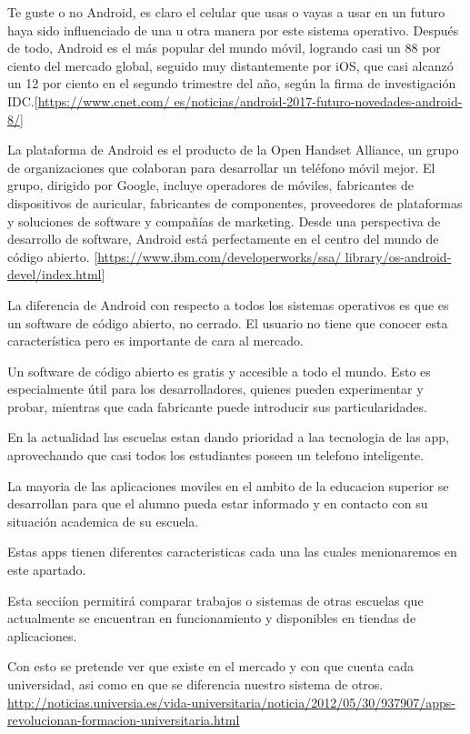 Te guste o no Android, es claro el celular que usas o vayas a usar en un futuro haya sido influenciado de 
una u otra manera por este sistema operativo. Después de todo, Android es el más popular del mundo móvil, 
logrando casi un 88 por ciento del mercado global, seguido muy distantemente por iOS, que casi alcanzó un 
12 por ciento en el segundo trimestre del año, según la firma de investigación IDC.[\url{https://www.cnet.com/
es/noticias/android-2017-futuro-novedades-android-8/}]

La plataforma de Android es el producto de la Open Handset Alliance, un grupo de organizaciones que 
colaboran para desarrollar un teléfono móvil mejor. El grupo, dirigido por Google, incluye operadores de 
móviles, fabricantes de dispositivos de auricular, fabricantes de componentes, proveedores de plataformas y 
soluciones de software y compañías de marketing. Desde una perspectiva de desarrollo de software, Android 
está perfectamente en el centro del mundo de código abierto. [\url{https://www.ibm.com/developerworks/ssa/
library/os-android-devel/index.html}]

La diferencia de Android con respecto a todos los sistemas operativos  es que es un software de código 
abierto, no cerrado. El usuario no tiene que conocer esta característica pero es importante de cara al 
mercado.


Un software de código abierto es gratis y accesible a todo el mundo. Esto es especialmente útil para los 
desarrolladores, quienes pueden experimentar y probar, mientras que cada fabricante puede introducir sus 
particularidades. 


En la actualidad las escuelas estan dando prioridad a laa tecnologia de las app, aprovechando que casi 
todos los estudiantes poseen un telefono inteligente.


La mayoria de las aplicaciones moviles en el ambito de la educacion superior se desarrollan para que el 
alumno pueda estar informado y en contacto con su situación academica de su escuela.

Estas apps tienen diferentes caracteristicas cada una las cuales menionaremos en este apartado.

Esta secciíon permitirá comparar trabajos o sistemas de otras escuelas que actualmente se encuentran en 
funcionamiento y disponibles en tiendas de aplicaciones.

Con esto se pretende ver que existe en el mercado y con que cuenta cada universidad, asi como en que se 
diferencia nuestro sistema de otros.
\url{http://noticias.universia.es/vida-universitaria/noticia/2012/05/30/937907/apps-revolucionan-formacion-universitaria.html}

